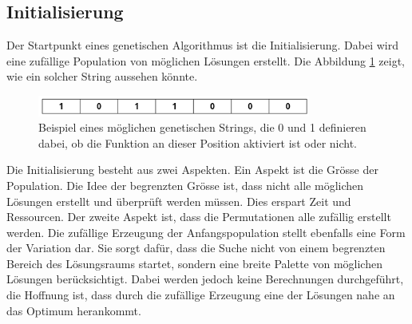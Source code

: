 %
%
%
%
\subsection{Initialisierung
\label{buch:paper:varalg:subsection:initialization}}
Der Startpunkt eines genetischen Algorithmus ist die Initialisierung.
Dabei wird eine zufällige Population von möglichen Lösungen erstellt.
Die Abbildung \ref{fig:possible_genetic_string} zeigt, wie ein solcher 
String aussehen könnte.
\begin{figure}
	\centering
	\includegraphics[width=0.8\textwidth]{
        papers/varalg/images/teil3/01GeneticString.png
        }
	\caption{
		Beispiel eines möglichen genetischen Strings, die 0 und 1 definieren dabei,
		ob die Funktion an dieser Position aktiviert ist oder nicht.
		}
	\label{fig:possible_genetic_string}
\end{figure}
Die Initialisierung besteht aus zwei Aspekten. Ein Aspekt ist die Grösse
der Population. Die Idee der begrenzten Grösse ist, dass nicht alle möglichen
Lösungen erstellt und überprüft werden müssen. Dies erspart Zeit und Ressourcen.
Der zweite Aspekt ist, dass die Permutationen alle zufällig erstellt werden.
Die zufällige Erzeugung der Anfangspopulation stellt ebenfalls eine Form 
der Variation dar. Sie sorgt dafür, dass die Suche nicht von einem begrenzten 
Bereich des Lösungsraums startet, sondern eine breite Palette von möglichen 
Lösungen berücksichtigt. Dabei werden jedoch keine Berechnungen durchgeführt,
die Hoffnung ist, dass durch die zufällige Erzeugung eine der Lösungen nahe
an das Optimum herankommt.

